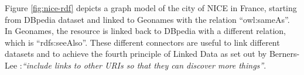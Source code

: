 \begin{figure}[ht!]
\end{figure}

Figure \ref{fig:nice-rdf} depicts a graph model of the city of NICE in France, starting from DBpedia \cite{dbpedia2009} dataset and linked to Geonames with the relation ``owl:sameAs''. In Geonames, the resource is linked back to DBpedia with a different relation, which is ``rdfs:seeAlso''. These different connectors are useful to link different datasets and to achieve the fourth principle of Linked Data as set out by Berners-Lee \cite{timld}:\textit{``include links to other URIs so that they can discover more things''}. 

